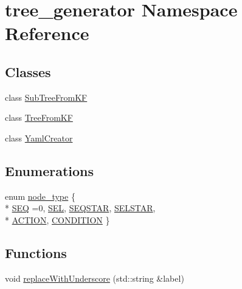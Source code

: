 \hypertarget{namespacetree__generator}{\section{tree\-\_\-generator Namespace Reference}
\label{namespacetree__generator}
}
\subsection*{Classes}
\begin{DoxyCompactItemize}
\item 
class \hyperlink{classtree__generator_1_1SubTreeFromKF}{Sub\-Tree\-From\-K\-F}
\item 
class \hyperlink{classtree__generator_1_1TreeFromKF}{Tree\-From\-K\-F}
\item 
class \hyperlink{classtree__generator_1_1YamlCreator}{Yaml\-Creator}
\end{DoxyCompactItemize}
\subsection*{Enumerations}
\begin{DoxyCompactItemize}
\item 
enum \hyperlink{namespacetree__generator_a9bc65da10ffa6c37e8717801e2f3a36c}{node\-\_\-type} \{ \\*
\hyperlink{namespacetree__generator_a9bc65da10ffa6c37e8717801e2f3a36ca25b1e67936c5b5bb0f08476055226b5c}{S\-E\-Q} =0, 
\hyperlink{namespacetree__generator_a9bc65da10ffa6c37e8717801e2f3a36ca7b0d4c3b3e5dbafc790ac4ffc9a65d0d}{S\-E\-L}, 
\hyperlink{namespacetree__generator_a9bc65da10ffa6c37e8717801e2f3a36caa98b1df5905b1a47dc633a439b14501a}{S\-E\-Q\-S\-T\-A\-R}, 
\hyperlink{namespacetree__generator_a9bc65da10ffa6c37e8717801e2f3a36ca129219a93b4c472d7d41bb8828979bad}{S\-E\-L\-S\-T\-A\-R}, 
\\*
\hyperlink{namespacetree__generator_a9bc65da10ffa6c37e8717801e2f3a36cadf0fa1a113e6aa7fb488db50d840dd92}{A\-C\-T\-I\-O\-N}, 
\hyperlink{namespacetree__generator_a9bc65da10ffa6c37e8717801e2f3a36cad521aa9a6db33d4aa5e23c6cd5efc51c}{C\-O\-N\-D\-I\-T\-I\-O\-N}
 \}
\end{DoxyCompactItemize}
\subsection*{Functions}
\begin{DoxyCompactItemize}
\item 
void \hyperlink{namespacetree__generator_afaba6c339abcc27aafb585044b662d2e}{replace\-With\-Underscore} (std\-::string \&label)
\end{DoxyCompactItemize}


